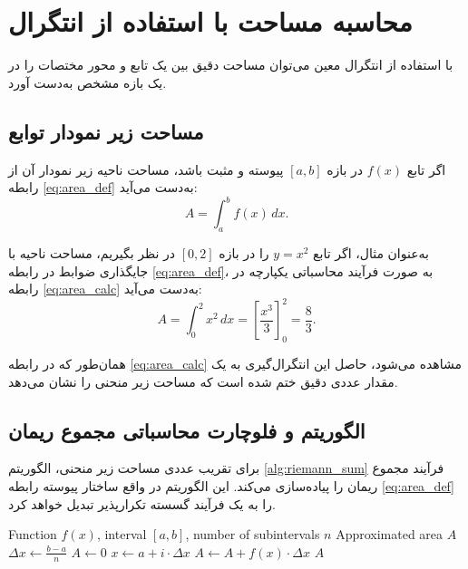 \hypertarget{target:chap3}{}\chapter{محاسبه مساحت با استفاده از انتگرال}\label{chap:area}
با استفاده از انتگرال معین می‌توان مساحت دقیق بین یک تابع و محور مختصات را در یک بازه مشخص به‌دست آورد.

\section{مساحت زیر نمودار توابع}
اگر تابع $f(x)$ در بازه $[a,b]$ پیوسته و مثبت باشد، مساحت ناحیه زیر نمودار آن از رابطه \eqref{eq:area_def} به‌دست می‌آید:
\begin{equation}
	A = \int_{a}^{b} f(x) \, dx.
	\label{eq:area_def}
\end{equation}

به‌عنوان مثال، اگر تابع $y=x^2$ را در بازه $[0,2]$ در نظر بگیریم، مساحت ناحیه با جایگذاری ضوابط در رابطه \eqref{eq:area_def}، به صورت فرآیند محاسباتی یکپارچه در رابطه \eqref{eq:area_calc} به‌دست می‌آید:
\begin{equation}
	A = \int_{0}^{2} x^2 \, dx = \left[ \frac{x^3}{3} \right]_0^2 = \frac{8}{3}.
	\label{eq:area_calc}
\end{equation}

همان‌طور که در رابطه \eqref{eq:area_calc} مشاهده می‌شود، حاصل این انتگرال‌گیری به یک مقدار عددی دقیق ختم شده است که مساحت زیر منحنی را نشان می‌دهد.

\section{الگوریتم و فلوچارت محاسباتی مجموع ریمان}
برای تقریب عددی مساحت زیر منحنی، الگوریتم \ref{alg:riemann_sum} فرآیند مجموع ریمان را پیاده‌سازی می‌کند. این الگوریتم در واقع ساختار پیوسته رابطه \eqref{eq:area_def} را به یک فرآیند گسسته تکرارپذیر تبدیل خواهد کرد.

\begin{latin}
	\begin{algorithm}
		\caption{Left Riemann Sum Approximation}
		\label{alg:riemann_sum}
		\begin{algorithmic}[1]
			\REQUIRE Function $f(x)$, interval $[a, b]$, number of subintervals $n$
			\ENSURE Approximated area $A$
			\STATE $\Delta x \gets \frac{b - a}{n}$
			\STATE $A \gets 0$
			\STATE $x \gets a + i \cdot \Delta x$
			\STATE $A \gets A + f(x) \cdot \Delta x$
			\ENDFOR
			\RETURN $A$
		\end{algorithmic}
	\end{algorithm}
\end{latin}

